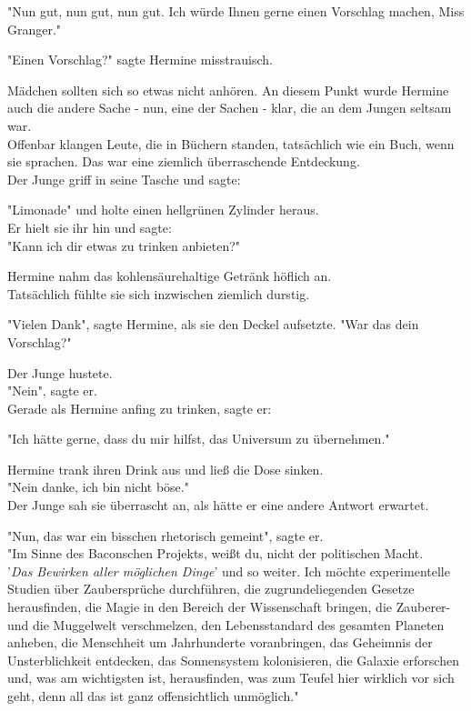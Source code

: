 {"Nun gut, nun gut, nun gut. Ich würde Ihnen gerne einen Vorschlag machen, Miss Granger."

"Einen Vorschlag?" sagte Hermine misstrauisch.

Mädchen sollten sich so etwas nicht anhören. An diesem Punkt wurde Hermine auch die andere Sache - nun, eine der Sachen - klar, die an dem Jungen seltsam war.\\ Offenbar klangen Leute, die in Büchern standen, tatsächlich wie ein Buch, wenn sie sprachen. Das war eine ziemlich überraschende Entdeckung.\\ Der Junge griff in seine Tasche und sagte:

"Limonade" und holte einen hellgrünen Zylinder heraus.\\ Er hielt sie ihr hin und sagte:\\ "Kann ich dir etwas zu trinken anbieten?"

Hermine nahm das kohlensäurehaltige Getränk höflich an.\\ Tatsächlich fühlte sie sich inzwischen ziemlich durstig.

"Vielen Dank", sagte Hermine, als sie den Deckel aufsetzte. "War das dein Vorschlag?"

Der Junge hustete.\\ "Nein", sagte er.\\ Gerade als Hermine anfing zu trinken, sagte er:

"Ich hätte gerne, dass du mir hilfst, das Universum zu übernehmen."

Hermine trank ihren Drink aus und ließ die Dose sinken.\\ "Nein danke, ich bin nicht böse."\\ Der Junge sah sie überrascht an, als hätte er eine andere Antwort erwartet.

"Nun, das war ein bisschen rhetorisch gemeint", sagte er.\\ "Im Sinne des Baconschen Projekts, weißt du, nicht der politischen Macht.\\ '\emph{Das Bewirken aller möglichen Dinge}' und so weiter. Ich möchte experimentelle Studien über Zaubersprüche durchführen, die zugrundeliegenden Gesetze herausfinden, die Magie in den Bereich der Wissenschaft bringen, die Zauberer- und die Muggelwelt verschmelzen, den Lebensstandard des gesamten Planeten anheben, die Menschheit um Jahrhunderte voranbringen, das Geheimnis der Unsterblichkeit entdecken, das Sonnensystem kolonisieren, die Galaxie erforschen und, was am wichtigsten ist, herausfinden, was zum Teufel hier wirklich vor sich geht, denn all das ist ganz offensichtlich unmöglich."

}
